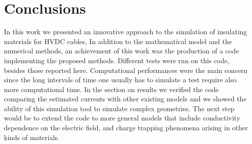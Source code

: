 \documentclass[11pt,a4paper]{article}
\begin{document}
\section{Conclusions}
In this work we presented an innovative approach to the simulation of insulating materials for HVDC cables, In addition to the mathematical model and the numerical methods, an achievement of this work was the production of a code implementing the proposed methods. Different tests were run on this code, besides those reported here. Computational performances were the main concern since the long intervals of time one usually has to simulate a test require also more computational time. In the section on results we verified the code comparing the estimated currents with other existing models and we showed the ability of this simulation tool to simulate complex geometries. The next step would be to extend the code to more general models that include conductivity dependence on the electric field, and charge trapping phenomena arising in other kinds of materials.\\
\end{document}
